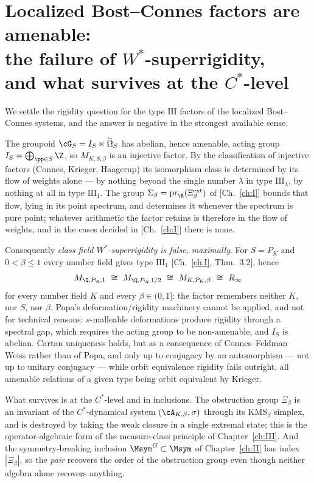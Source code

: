 \chapter[Amenability and the failure of superrigidity]{Localized Bost--Connes factors are amenable:\\ the failure of $W^*$-superrigidity,\\ and what survives at the $C^*$-level}\label{ch:IX}
\begin{summary}
We settle the rigidity question for the type $\mathrm{III}$ factors of the localized
Bost--Connes systems, and the answer is negative in the strongest available sense.

The groupoid $\cG_S=I_S\ltimes\widetilde\Omega_S$ has abelian, hence amenable, acting group
$I_S=\bigoplus_{\pp\in S}\Z$, so $M_{K,S,\beta}$ is an injective factor. By the classification of
injective factors (Connes, Krieger, Haagerup) its isomorphism class is determined by its flow
of weights alone --- by nothing beyond the single number $\lambda$ in type
$\mathrm{III}_\lambda$, by nothing at all in type $\mathrm{III}_1$. The group
$\Sigma_\beta=\mathrm{pr}_\R(\Xi^{\mathrm{ext}}_\beta)$ of [Ch.~\ref{ch:I}] bounds that flow, lying
in its point spectrum, and determines it whenever the spectrum is pure point; whatever
arithmetic the factor retains is therefore in the flow of weights, and in the cases decided
in [Ch.~\ref{ch:I}] there is none.

Consequently \emph{class field $W^*$-superrigidity is false, maximally}. For $S=P_K$ and
$0<\beta\le1$ every number field gives type $\mathrm{III}_1$ [Ch.~\ref{ch:I}, Thm.~3.2], hence
\[
M_{\Q,P_\Q,1}\ \cong\ M_{\Q,P_\Q,1/2}\ \cong\ M_{K,P_K,\beta}\ \cong\ R_\infty
\]
for every number field $K$ and every $\beta\in(0,1]$: the factor remembers neither $K$, nor
$S$, nor $\beta$. Popa's deformation/rigidity machinery cannot be applied, and not for
technical reasons: $s$-malleable deformations produce rigidity through a spectral gap, which
requires the acting group to be non-amenable, and $I_S$ is abelian. Cartan uniqueness holds,
but as a consequence of Connes--Feldman--Weiss rather than of Popa, and only up to conjugacy
by an automorphism --- not up to unitary conjugacy --- while orbit equivalence rigidity fails
outright, all amenable relations of a given type being orbit equivalent by Krieger.

What survives is at the $C^*$-level and in inclusions. The obstruction group $\Xi_\beta$ is
an invariant of the $C^*$-dynamical system $(\cA_{K,S},\sigma)$ through its
$\mathrm{KMS}_\beta$ simplex, and is destroyed by taking the weak closure in a single
extremal state; this is the operator-algebraic form of the measure-class principle of
Chapter~\ref{ch:III}. And the symmetry-breaking inclusion
$\Msym^{G}\subset\Msym$ of Chapter~\ref{ch:II} has index $|\Xi_\beta|$, so the \emph{pair} recovers the
order of the obstruction group even though neither algebra alone recovers anything.
\end{summary}

